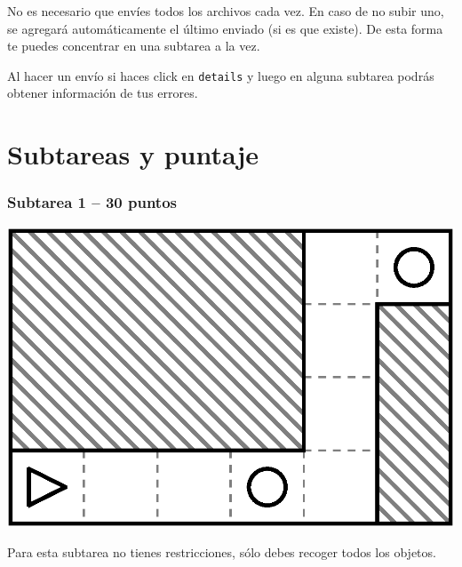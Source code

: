\documentclass{oci}
\begin{document}
No es necesario que envíes todos los archivos cada vez. En caso de no subir uno, se agregará automáticamente el último enviado (si es que existe).
De esta forma te puedes concentrar en una subtarea a la vez.

Al hacer un envío si haces click en \texttt{details} y luego en alguna subtarea podrás obtener información de tus errores.


\section*{Subtareas y puntaje}

\subsubsection*{Subtarea 1 -- 30 puntos}
\begin{minipage}{0.5\linewidth}
  \centering
\includegraphics[scale=0.5]{laberintos/Subtarea1.eps}
\end{minipage}
\begin{minipage}{0.45\linewidth}
Para esta subtarea no tienes restricciones, sólo debes recoger todos los objetos.
\end{minipage}
\end{document}

